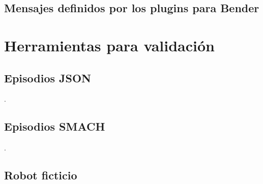 \lstset{style=/Style/ROS/MSG}


\subsection{Mensajes definidos por los plugins para Bender}

\lstset{style=/Style/ROS/MSG}




\section{Herramientas para validación}

\subsection{Episodios JSON}
.

\subsection{Episodios SMACH}
.

\subsection{Robot ficticio}



